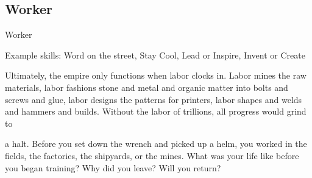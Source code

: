 \subsection{Worker}
                                                      Worker

Example skills: Word on the street, Stay Cool, Lead or Inspire, Invent or Create

Ultimately, the empire only functions when labor clocks in. Labor mines the raw materials, labor fashions
stone and metal and organic matter into bolts and screws and glue, labor designs the patterns for printers,
labor shapes and welds and hammers and builds. Without the labor of trillions, all progress would grind to

a halt. Before you set down the wrench and picked up a helm, you worked in the fields, the factories, the
shipyards, or the mines. What was your life like before you began training? Why did you leave? Will you
return?



